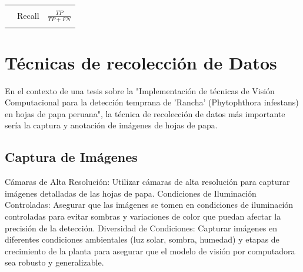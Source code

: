 \begin{table}[H]
\begin{tabular}{lll}
		\multicolumn{1}{|l|}{}                                                                                                                                                                                                                            & \multicolumn{1}{l|}{}                                                                                          & \multicolumn{1}{l|}{}                                                                                                             \\ \cline{2-3} 
		\multicolumn{1}{|l|}{}                                                                                                                                                                                                                            & \multicolumn{1}{l|}{\multirow{2}{*}{Recall}}                                                                   & \multicolumn{1}{l|}{\multirow{2}{*}{\(\frac{TP}{TP + FN}\)}}                                                                      \\
		\multicolumn{1}{|l|}{}                                                                                                                                                                                                                            & \multicolumn{1}{l|}{}                                                                                          & \multicolumn{1}{l|}{}                                                                                                             \\ \hline
		&                                                                                                                &                                                                                                                                   \\ \hline
	\end{tabular}
\end{table}
\section{Técnicas de recolección de Datos}
En el contexto de una tesis sobre la "Implementación de técnicas de Visión Computacional para la detección temprana de 'Rancha' (Phytophthora infestans) en hojas de papa peruana", la técnica de recolección de datos más importante sería la captura y anotación de imágenes de hojas de papa. 

\subsection{Captura de Imágenes}
Cámaras de Alta Resolución: Utilizar cámaras de alta resolución para capturar imágenes detalladas de las hojas de papa.
Condiciones de Iluminación Controladas: Asegurar que las imágenes se tomen en condiciones de iluminación controladas para evitar sombras y variaciones de color que puedan afectar la precisión de la detección.
Diversidad de Condiciones: Capturar imágenes en diferentes condiciones ambientales (luz solar, sombra, humedad) y etapas de crecimiento de la planta para asegurar que el modelo de visión por computadora sea robusto y generalizable.

